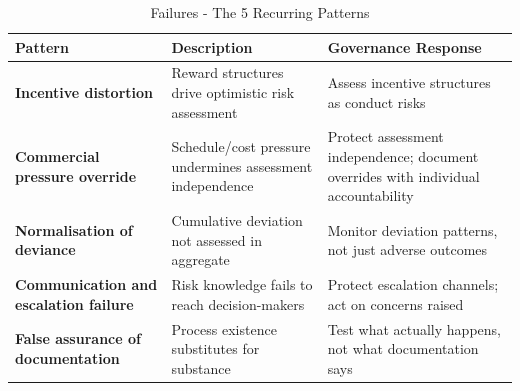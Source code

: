 \begin{table}[H]
  \centering
  \renewcommand{\arraystretch}{1.5}
  \begin{tabularx}{\textwidth}{ | >{\raggedright\arraybackslash}p{} 
								| >{\raggedright\arraybackslash}p{} 
                                | >{\raggedright\arraybackslash}X | }
    \hline
    \textbf{Pattern} & \textbf{Description} & \textbf{Governance Response} \\
    \hline
    \textbf{Incentive distortion} & Reward structures drive optimistic risk assessment & Assess incentive structures as conduct risks\\
    \hline
    \textbf{Commercial pressure override} & Schedule/cost pressure undermines assessment independence & Protect assessment independence; document overrides with individual accountability\\
    \hline
    \textbf{Normalisation of deviance} & Cumulative deviation not assessed in aggregate & Monitor deviation patterns, not just adverse outcomes\\
    \hline
    \textbf{Communication and escalation failure} & Risk knowledge fails to reach decision-makers & Protect escalation channels; act on concerns raised\\
    \hline
    \textbf{False assurance of documentation} & Process existence substitutes for substance & Test what actually happens, not what documentation says\\
    \hline
  \end{tabularx}
  \caption{Failures - The 5 Recurring Patterns}
\end{table}

